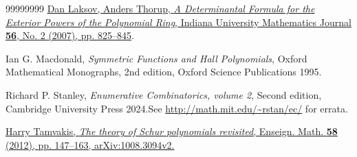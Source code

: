 \documentclass[numbers=enddot,12pt,final,onecolumn,notitlepage,english]{scrartcl}%
\theoremstyle{definition}
\begin{document}
\begin{thebibliography}{99999999}
\href{https://www.jstor.org/stable/24902713}{Dan
Laksov, Anders Thorup, \textit{A Determinantal Formula for the Exterior Powers
of the Polynomial Ring}, Indiana University Mathematics Journal \textbf{56},
No. 2 (2007), pp. 825--845}.

Ian G. Macdonald, \textit{Symmetric Functions and
Hall Polynomials}, Oxford Mathematical Monographs, 2nd edition, Oxford Science
Publications 1995.

Richard P. Stanley, \textit{Enumerative
Combinatorics, volume 2}, Second edition, Cambridge University Press
2024.\newline See \url{http://math.mit.edu/~rstan/ec/} for errata.

\href{https://arxiv.org/abs/1008.3094v2}{Harry
Tamvakis, \textit{The theory of Schur polynomials revisited}, Enseign. Math.
\textbf{58} (2012), pp. 147--163, arXiv:1008.3094v2.}
\end{thebibliography}
\end{document}
